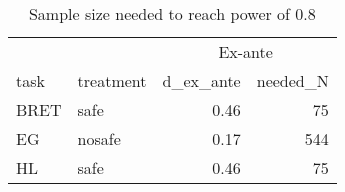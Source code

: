 \begin{table}

\caption{Sample size needed to reach power of 0.8}
\centering
\begin{tabular}[t]{llrr}
\toprule
\multicolumn{1}{c}{} & \multicolumn{1}{c}{} & \multicolumn{2}{c}{Ex-ante} \\
\cmidrule(l{3pt}r{3pt}){3-4}
task & treatment & d\_ex\_ante & needed\_N\\
\midrule
BRET & safe & 0.46 & 75\\
EG & nosafe & 0.17 & 544\\
HL & safe & 0.46 & 75\\
\bottomrule
\end{tabular}
\end{table}